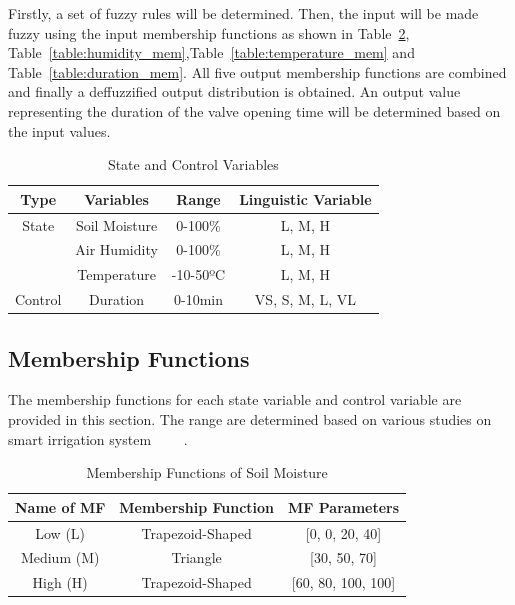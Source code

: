 \documentclass[conference]{IEEEtran}
\begin{document}
Firstly, a set of fuzzy rules will be determined. Then, the input will be made fuzzy using the input membership functions as shown in Table~\ref{table:moisture_mem}, Table~\ref{table:humidity_mem},Table~\ref{table:temperature_mem} and Table~\ref{table:duration_mem}. All five output membership functions are combined and finally a deffuzzified output distribution is obtained. An output value representing the duration of the valve opening time will be determined based on the input values.

 \begin{table}[!ht]
    \caption{State and Control Variables}
    \label{table:input_output}
    \centering
    \begin{tabular}{c c c c }
        \hline 
        \bfseries Type & \bfseries Variables & \bfseries Range & \bfseries Linguistic Variable  \\
        \hline  
          State & Soil Moisture & 0-100\% & L, M, H\\
           & Air Humidity & 0-100\% & L, M, H\\
           & Temperature & -10-50ºC & L, M, H\\
          \hline
          Control & Duration & 0-10min & VS, S, M, L, VL\\
    \hline
    \end{tabular}
\end{table}

\subsection{Membership Functions}
The membership functions for each state variable and control variable are provided in this section. The range are determined based on various studies on smart irrigation system ~\cite{kokkonis_kontogiannis_tomtsis_2017}~\cite{alpay_erdem_2018}~\cite{mohammed2021intelligent}~\cite{truneh2018fuzzy}.

 \begin{table}[!ht]
    \caption{Membership Functions of Soil Moisture}
    \label{table:moisture_mem}
    \centering
    \begin{tabular}{c c c}
        \hline 
        \bfseries Name of MF & \bfseries Membership Function & \bfseries MF Parameters\\
        \hline  
        Low (L) & Trapezoid-Shaped & [0, 0, 20, 40] \\
        Medium (M) & Triangle & [30, 50, 70]\\
        High (H) & Trapezoid-Shaped & [60, 80, 100, 100]\\
    \hline
    \end{tabular}
\end{table}
\end{document}
